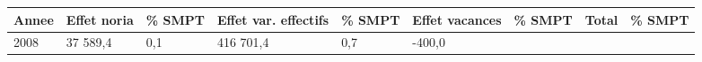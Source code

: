\begin{longtable}[]{@{}lllllllll@{}}
\toprule
\begin{minipage}[b]{0.05\columnwidth}\raggedright
Annee\strut
\end{minipage} & \begin{minipage}[b]{0.10\columnwidth}\raggedright
Effet noria\strut
\end{minipage} & \begin{minipage}[b]{0.06\columnwidth}\raggedright
\% SMPT\strut
\end{minipage} & \begin{minipage}[b]{0.16\columnwidth}\raggedright
Effet var. effectifs\strut
\end{minipage} & \begin{minipage}[b]{0.06\columnwidth}\raggedright
\% SMPT\strut
\end{minipage} & \begin{minipage}[b]{0.12\columnwidth}\raggedright
Effet vacances\strut
\end{minipage} & \begin{minipage}[b]{0.06\columnwidth}\raggedright
\% SMPT\strut
\end{minipage} & \begin{minipage}[b]{0.10\columnwidth}\raggedright
Total\strut
\end{minipage} & \begin{minipage}[b]{0.06\columnwidth}\raggedright
\% SMPT\strut
\end{minipage}\tabularnewline
\midrule
\endhead
\begin{minipage}[t]{0.05\columnwidth}\raggedright
2008\strut
\end{minipage} & \begin{minipage}[t]{0.10\columnwidth}\raggedright
37 589,4\strut
\end{minipage} & \begin{minipage}[t]{0.06\columnwidth}\raggedright
0,1\strut
\end{minipage} & \begin{minipage}[t]{0.16\columnwidth}\raggedright
416 701,4\strut
\end{minipage} & \begin{minipage}[t]{0.06\columnwidth}\raggedright
0,7\strut
\end{minipage} & \begin{minipage}[t]{0.12\columnwidth}\raggedright
-400,0\strut
\end{minipage} & \begin{minipage}[t]{0.06\columnwidth}\raggedright

\end{minipage}
\end{longtable}
